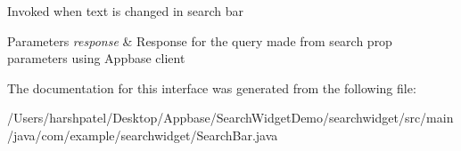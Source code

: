 Invoked when text is changed in search bar 
\begin{DoxyParams}{Parameters}
{\em response} & Response for the query made from search prop parameters using Appbase client \\
\hline
\end{DoxyParams}


The documentation for this interface was generated from the following file\+:\begin{DoxyCompactItemize}
\item 
/\+Users/harshpatel/\+Desktop/\+Appbase/\+Search\+Widget\+Demo/searchwidget/src/main/java/com/example/searchwidget/Search\+Bar.\+java\end{DoxyCompactItemize}
